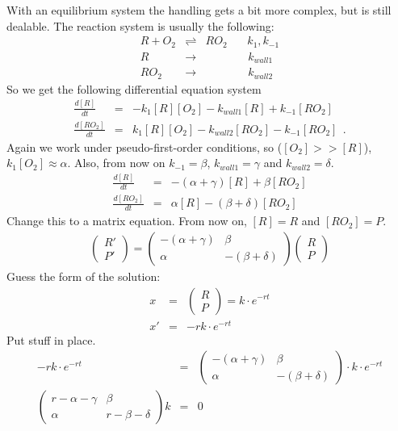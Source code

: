 \documentclass[10pt, a4paper]{article}
\begin{document}
~\\
~\\
With an equilibrium system the handling gets a bit more complex, but is still dealable. The reaction system is usually the following: 
\begin{eqnarray*}
R + O_2 &\rightleftharpoons & RO_2 \:\:\:\:\:\:\:\: k_1, k_{-1} \\
R &\rightarrow&           \:\:\:\:\:\:\:\:\:\:\:\:\:\:\:\:\: k_{wall1} \\
RO_2 &\rightarrow&           \:\:\:\:\:\:\:\:\:\:\:\:\:\:\:\:\: k_{wall2}  
\end{eqnarray*}
So we get the following differential equation system 
\begin{eqnarray*}
\frac{d[R]}{dt} &=& -k_1[R][O_2] - k_{wall1}[R] + k_{-1}[RO_2] \\
\frac{d[RO_2]}{dt} &=& k_1[R][O_2] - k_{wall2}[RO_2] - k_{-1}[RO_2] \:\: .
\end{eqnarray*}
Again we work under pseudo-first-order conditions, so ($[O_2] >> [R]$), $k_1[O_2] \approx \alpha$. Also, from now on $k_{-1} = \beta$, $k_{wall1} = \gamma$ and $k_{wall2} = \delta$. 
\begin{eqnarray*}
\frac{d[R]}{dt} &=& -(\alpha + \gamma)[R] + \beta[RO_2] \\
\frac{d[RO_2]}{dt} &=& \alpha[R] - (\beta + \delta)[RO_2] 
\end{eqnarray*}
Change this to a matrix equation. From now on, $[R] = R$ and $[RO_2] = P$. 
\begin{eqnarray*}
\begin{pmatrix}
R' \\
P' 
\end{pmatrix}
= 
\begin{pmatrix}
-(\alpha + \gamma) & \beta \\
\alpha & -(\beta + \delta) 
\end{pmatrix}
\begin{pmatrix}
R \\
P 
\end{pmatrix}
\end{eqnarray*}
Guess the form of the solution: 
\begin{eqnarray*}
x &=& 
\begin{pmatrix}
R \\
P 
\end{pmatrix}
= k \cdot e^{-rt} \\
x' &=& -rk \cdot e^{-rt}
\end{eqnarray*}
Put stuff in place. 
\begin{eqnarray*}
-rk \cdot e^{-rt} &=& 
\begin{pmatrix}
-(\alpha + \gamma) & \beta \\
\alpha & -(\beta + \delta) 
\end{pmatrix} 
\cdot k \cdot e^{-rt} \\
\begin{pmatrix}
r -\alpha - \gamma & \beta \\
\alpha & r - \beta - \delta 
\end{pmatrix} 
k &=& 0 
\end{eqnarray*}
\end{document}

